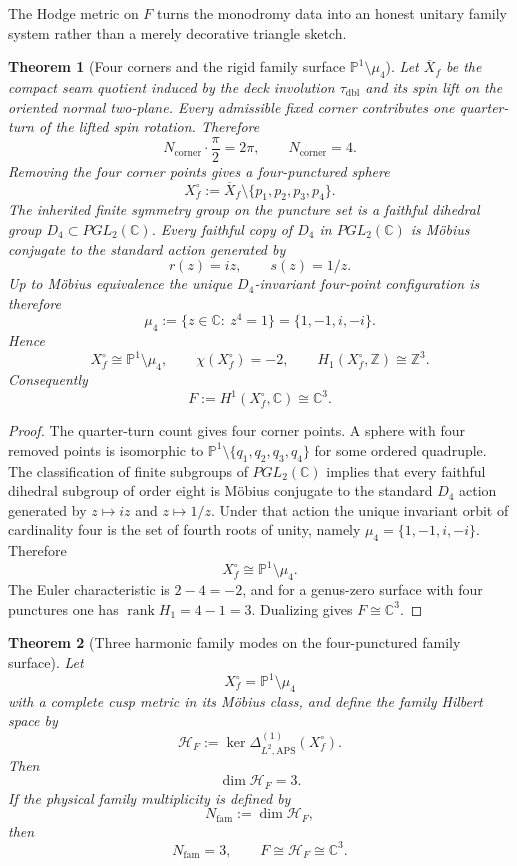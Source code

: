 \documentclass[11pt,a4paper]{article}
\newtheorem{theorem}{Theorem}[section]
\theoremstyle{definition}
\theoremstyle{remark}
\DeclareMathOperator{\rank}{rank}
\newcommand{\taudbl}{\tau_{\mathrm{dbl}}}
\begin{document}
The Hodge metric on $F$ turns the monodromy data into an honest unitary family system rather than a merely decorative triangle sketch.

\begin{theorem}[Four corners and the rigid family surface \texorpdfstring{$\mathbb P^1\setminus\mu_4$}{P1 minus mu4}]
\label{thm:topological-family-closure}
Let $\overline X_f$ be the compact seam quotient induced by the deck involution $\taudbl$ and its
spin lift on the oriented normal two-plane. Every admissible fixed corner contributes one
quarter-turn of the lifted spin rotation. Therefore
\[
N_{\mathrm{corner}}\cdot \frac{\pi}{2}=2\pi,
\qquad
N_{\mathrm{corner}}=4.
\]
Removing the four corner points gives a four-punctured sphere
\[
X_f^\circ:=\overline X_f\setminus\{p_1,p_2,p_3,p_4\}.
\]
The inherited finite symmetry group on the puncture set is a faithful dihedral group
$D_4\subset PGL_2(\mathbb C)$. Every faithful copy of $D_4$ in $PGL_2(\mathbb C)$ is M\"obius
conjugate to the standard action generated by
\[
r(z)=iz,
\qquad
s(z)=1/z.
\]
Up to M\"obius equivalence the unique $D_4$-invariant four-point configuration is therefore
\[
\mu_4:=\{z\in\mathbb C:\ z^4=1\}=\{1,-1,i,-i\}.
\]
Hence
\[
X_f^\circ\cong \mathbb P^1\setminus\mu_4,
\qquad
\chi(X_f^\circ)=-2,
\qquad
H_1(X_f^\circ,\mathbb Z)\cong \mathbb Z^3.
\]
Consequently
\[
F:=H^1(X_f^\circ,\mathbb C)\cong \mathbb C^3.
\]
\end{theorem}

\begin{proof}
The quarter-turn count gives four corner points. A sphere with four removed points is isomorphic to
$\mathbb P^1\setminus\{q_1,q_2,q_3,q_4\}$ for some ordered quadruple. The classification of finite
subgroups of $PGL_2(\mathbb C)$ implies that every faithful dihedral subgroup of order eight is
M\"obius conjugate to the standard $D_4$ action generated by $z\mapsto iz$ and $z\mapsto 1/z$.
Under that action the unique invariant orbit of cardinality four is the set of fourth roots of
unity, namely $\mu_4=\{1,-1,i,-i\}$. Therefore
\[
X_f^\circ\cong \mathbb P^1\setminus\mu_4.
\]
The Euler characteristic is $2-4=-2$, and for a genus-zero surface with four punctures one has
$\rank H_1=4-1=3$. Dualizing gives $F\cong\mathbb C^3$.
\end{proof}

\begin{theorem}[Three harmonic family modes on the four-punctured family surface]
\label{thm:harmonic-family-modes}
Let
\[
X_f^\circ=\mathbb P^1\setminus\mu_4
\]
with a complete cusp metric in its M\"obius class, and define the family Hilbert space by
\[
\mathcal H_F:=\ker \Delta^{(1)}_{L^2,\mathrm{APS}}(X_f^\circ).
\]
Then
\[
\dim\mathcal H_F=3.
\]
If the physical family multiplicity is defined by
\[
N_{\mathrm{fam}}:=\dim\mathcal H_F,
\]
then
\[
N_{\mathrm{fam}}=3,
\qquad
F\cong \mathcal H_F\cong \mathbb C^3.
\]
\end{theorem}
\end{document}
